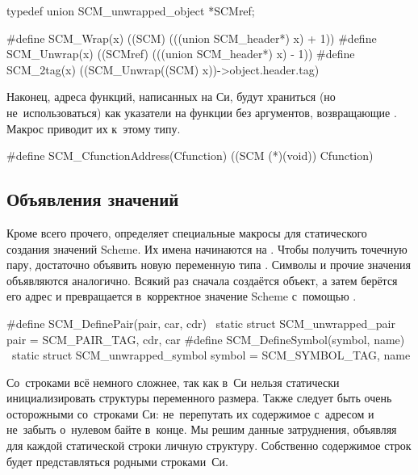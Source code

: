 \begin{code:c}
typedef union SCM_unwrapped_object *SCMref;

#define SCM_Wrap(x)   ((SCM)    (((union SCM_header*) x) + 1))
#define SCM_Unwrap(x) ((SCMref) (((union SCM_header*) x) - 1))
#define SCM_2tag(x)   ((SCM_Unwrap((SCM) x))->object.header.tag)
\end{code:c}

Наконец, адреса функций, написанных на Си, будут храниться (но
не~использоваться) как указатели на функции без аргументов, возвращающие
. Макрос  приводит их к~этому типу.

\begin{code:c}
#define SCM_CfunctionAddress(Cfunction) ((SCM (*)(void)) Cfunction)
\end{code:c}


\subsection{Объявления значений}\label{cc/data/ssect:values}

Кроме всего прочего,  определяет специальные макросы для
статического создания значений Scheme. Их имена начинаются на .
Чтобы получить точечную пару, достаточно объявить новую переменную типа
. Символы и прочие значения объявляются аналогично.
Всякий раз сначала создаётся объект, а затем берётся его адрес и превращается
в~корректное значение Scheme с~помощью .

\begin{code:c}
#define SCM_DefinePair(pair, car, cdr)  \
  static struct SCM_unwrapped_pair pair = {{SCM_PAIR_TAG}, cdr, car}
#define SCM_DefineSymbol(symbol, name)  \
  static struct SCM_unwrapped_symbol symbol = {{SCM_SYMBOL_TAG}, name}
\end{code:c}

Со~строками всё немного сложнее, так как в~Си нельзя статически инициализировать
структуры переменного размера. Также следует быть очень осторожными со~строками
Си: не~перепутать их содержимое с~адресом и не~забыть о~нулевом байте в~конце.
Мы решим данные затруднения, объявляя для каждой статической строки личную
структуру. Собственно содержимое строк будет представляться родными строками~Си.

